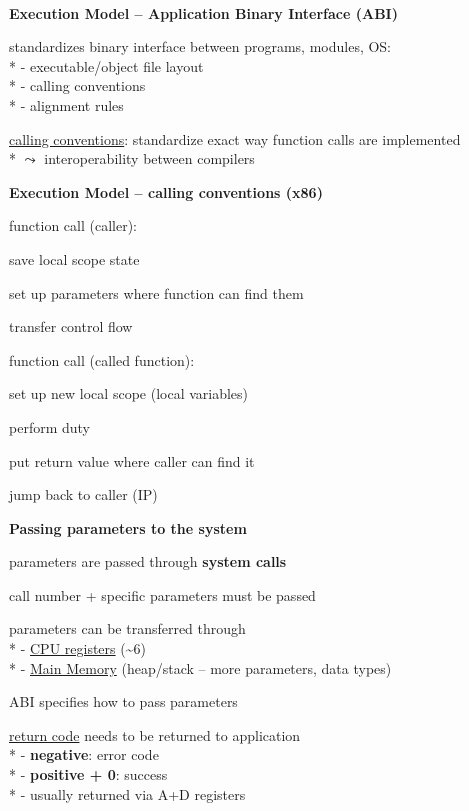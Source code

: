\ \\
\textbf{Execution Model -- Application Binary Interface (ABI)}
\begin{items}
  \item standardizes binary interface between programs, modules, OS: \\*
    - executable/object file layout \\*
    - calling conventions \\*
    - alignment rules
  \item \underline{calling conventions}: standardize exact way function calls are implemented \\*
    \( \leadsto \) interoperability between compilers
\end{items}

\textbf{Execution Model -- calling conventions (x86)}
\begin{items}
  \item function call (caller):
  \begin{enumeration}
    \item save local scope state 
    \item set up parameters where function can find them
    \item transfer control flow
  \end{enumeration}
  \item function call (called function):
  \begin{enumeration}
    \item set up new local scope (local variables)
    \item perform duty
    \item put return value where caller can find it
    \item jump back to caller (IP)
  \end{enumeration}
\end{items}

\textbf{Passing parameters to the system}
\begin{items}
  \item parameters are passed through \textbf{system calls}
  \item call number + specific parameters must be passed
  \item parameters can be transferred through \\*
    - \underline{CPU registers} (\textasciitilde 6) \\*
    - \underline{Main Memory} (heap/stack -- more parameters, data types)
  \item ABI specifies how to pass parameters
  \item \underline{return code} needs to be returned to application \\*
    - \textbf{negative}: error code \\*
    - \textbf{positive + 0}: success \\*
    - usually returned via A+D registers
\end{items}

